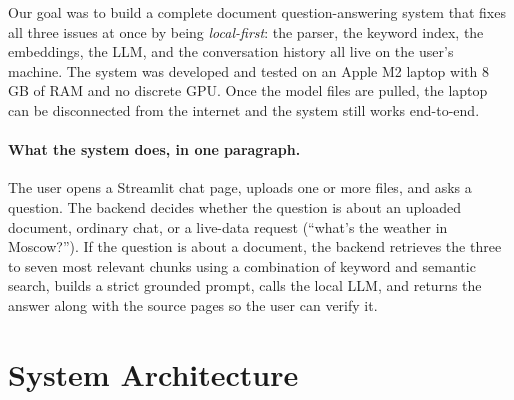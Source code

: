 \documentclass[11pt,a4paper]{article}
\begin{document}
\noindent
Our goal was to build a complete document question-answering system that
fixes all three issues at once by being \emph{local-first}: the parser, the
keyword index, the embeddings, the LLM, and the conversation history all
live on the user's machine. The system was developed and tested on an Apple
M2 laptop with 8\,GB of RAM and no discrete GPU. Once the model files are
pulled, the laptop can be disconnected from the internet and the system
still works end-to-end.

\paragraph{What the system does, in one paragraph.}
The user opens a Streamlit chat page, uploads one or more files, and asks a
question. The backend decides whether the question is about an uploaded
document, ordinary chat, or a live-data request (``what's the weather in
Moscow?''). If the question is about a document, the backend retrieves the
three to seven most relevant chunks using a combination of keyword and
semantic search, builds a strict grounded prompt, calls the local LLM, and
returns the answer along with the source pages so the user can verify it.

\section{System Architecture}
\label{sec:arch}
\end{document}

